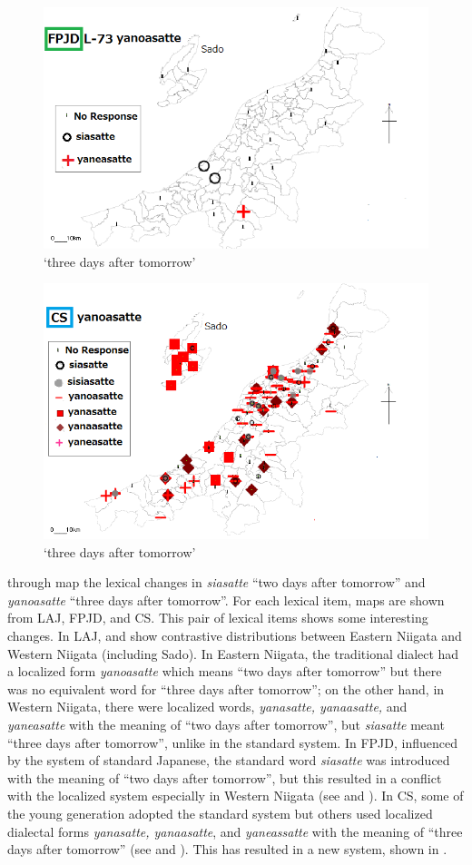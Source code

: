 \documentclass[output=paper]{LSP/langsci}
\begin{document}
\begin{figure}
\includegraphics[width=.75\textwidth]{illustrations/fuku2_fig6b}
\caption{`three days after tomorrow'}
\label{fig:6b}
\end{figure}

\begin{figure}
\includegraphics[width=.75\textwidth]{illustrations/fuku2_fig6c}
\caption{`three days after tomorrow'}
\label{fig:6c}
\end{figure}

 through  map the lexical changes in \textit{siasatte} “two days after tomorrow” and \textit{yanoasatte} “three days after tomorrow”.  For each lexical item, maps are shown from LAJ, FPJD, and CS. This pair of lexical items shows some interesting changes.  In LAJ,  and  show contrastive distributions between Eastern Niigata and Western Niigata (including Sado).  In Eastern Niigata, the traditional dialect had a localized form \textit{yanoasatte} which means “two days after tomorrow” but there was no equivalent word for “three days after tomorrow”; on the other hand, in Western Niigata, there were localized words, \textit{yanasatte, yanaasatte,} and \textit{yaneasatte} with the meaning of “two days after tomorrow”, but \textit{siasatte} meant “three days after tomorrow”, unlike in the standard system. In FPJD, influenced by the system of standard Japanese, the standard word \textit{siasatte} was introduced with the meaning of “two days after tomorrow”, but this resulted in a conflict with the localized system especially in Western Niigata (see  and ).  In CS, some of the young generation adopted the standard system but others used localized dialectal forms \textit{yanasatte, yanaasatte}, and \textit{yaneassatte} with the meaning of “three days after tomorrow” (see  and ). This has resulted in a new system, shown in .
\end{document}
